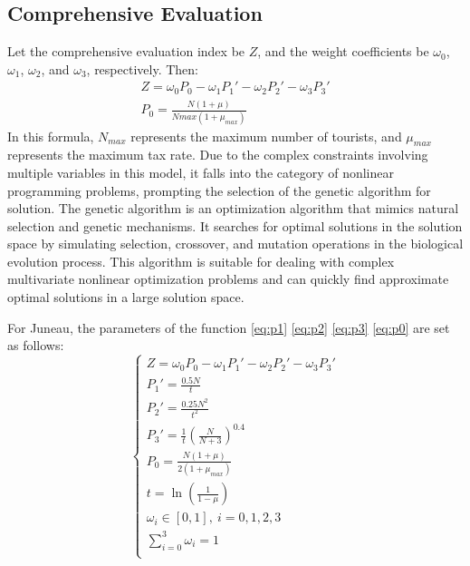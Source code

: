 \documentclass{mcmthesis}
\begin{document}
\subsection{Comprehensive Evaluation}

{Let the comprehensive evaluation index be $Z$, and the weight coefficients be $\omega _0$, $\omega _1$, $\omega _2$, and $\omega _3$, respectively. Then:}
\begin{gather}
  Z=\omega_0 P_0-\omega_1 P_1'-\omega_2 P_2'-\omega_3 P_3'\\
  P_0=\frac{N (1+\mu)}{Nmax (1+\mu_{max})}\label{eq:p0}
\end{gather}
{In this formula, $N_{max}$ represents the maximum number of tourists, and  $\mu_{max}$ represents the maximum tax rate.
Due to the complex constraints involving multiple variables in this model, it falls into the category of nonlinear programming problems, prompting the selection of the genetic algorithm for solution. The genetic algorithm is an optimization algorithm that mimics natural selection and genetic mechanisms. It searches for optimal solutions in the solution space by simulating selection, crossover, and mutation operations in the biological evolution process. This algorithm is suitable for dealing with complex multivariate nonlinear optimization problems and can quickly find approximate optimal solutions in a large solution space.}

{For Juneau, the parameters of the function \eqref{eq:p1} \eqref{eq:p2} \eqref{eq:p3} \eqref{eq:p0} are set as follows:}
\begin{equation}
  \begin{cases}
  Z=\omega_0 P_0-\omega_1 P_1'-\omega_2 P_2'-\omega_3 P_3'\\
  P_1'=\frac{0.5N}{t} \\
  P_2'=\frac{0.25N^2}{t^2} \\
  P_3'=\frac{1}{t}\left(\frac{N}{N+3}\right)^{0.4} \\
  P_0=\frac{N (1+\mu)}{2 (1+\mu_{max})} \\
  t = \ln\left(\frac{1}{1 - \mu}\right) \\
  \omega_i \in [0,1], \ i = 0,1,2,3 \\
  \sum\limits_{i=0}^3 \omega_i = 1 \\
  \end{cases}
  \end{equation}
\end{document}
